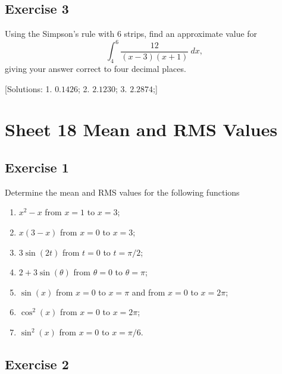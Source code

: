 \documentclass[
  11pt,
  oneside]{book}
\providecommand{\tightlist}{%
  \setlength{\itemsep}{0pt}\setlength{\parskip}{0pt}}
\newcommand{\slide}{}
\theoremstyle{definition}
\theoremstyle{definition}
\theoremstyle{definition}
\theoremstyle{definition}
\theoremstyle{remark}
\begin{document}
\slide

\subsection*{Exercise 3}\label{exercise-3-6}

Using the Simpson's rule with 6 strips, find an approximate value for
\[
\int_4^6\frac{12}{(x-3)(x+1)}\ dx,
\]
giving your answer correct to four decimal places.

{[}Solutions:
1. \(0.1426\);
2. \(2.1230\);
3. \(2.2874\);{]}

\slide

\section{Sheet 18 Mean and RMS Values}\label{sheet-18-mean-and-rms-values}

\slide

\subsection*{Exercise 1}\label{exercise-1-9}

Determine the mean and RMS values for the following functions

\begin{enumerate}
\def\labelenumi{\roman{enumi}.}
\tightlist
\item
  \(x^2-x\) from \(x=1\) to \(x=3\);
\item
  \(x(3-x)\) from \(x=0\) to \(x=3\);
\item
  \(3\sin(2t)\) from \(t=0\) to \(t=\pi/2\);
\item
  \(2+3\sin(\theta)\) from \(\theta=0\) to \(\theta=\pi\);
\item
  \(\sin(x)\) from \(x=0\) to \(x=\pi\) and from \(x=0\) to \(x=2\pi\);
\item
  \(\cos^2(x)\) from \(x=0\) to \(x=2\pi\);
\item
  \(\sin^2(x)\) from \(x=0\) to \(x=\pi/6\).
\end{enumerate}

\slide

\subsection*{Exercise 2}\label{exercise-2-9}
\end{document}

